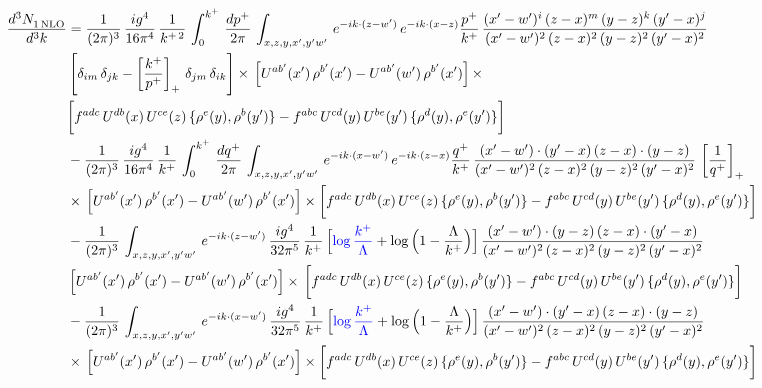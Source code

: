 \documentclass[9pt]{article}
\numberwithin{equation}{section}
\begin{document}
\begin{align}
     \frac{d^{3}N_{1\,\rm NLO}^{\rm}}{d^{3}k}  & = \frac{1}{(2\pi)^{3}}\, \frac{ig^{4}}{16\pi^{4}}\, \frac{1}{k^{+\,2}}\,\int_{0}^{k^{+}}\, \frac{dp^{+}}{2\pi}\,\int_{x,z,y,x',y'w'}\,e^{-ik\cdot (z-w^\prime)}\,e^{-ik\cdot (x-z)}\frac{p^{+}}{k^{+}}\,\frac{(x'-w')^{i}\,(z-x)^{m}\,(y-z)^{k}\,(y'-x)^{j}}{(x'-w')^{2}\,(z-x)^{2}\,(y-z)^{2}\,(y'-x)^{2}}\,\notag \\ & \left[\delta_{im}\,\delta_{jk}-\left[\frac{k^{+}}{p^{+}}\right]_{+}\, \delta_{jm}\,\delta_{ik}\right]\times\, \left[U^{ab'}(x')\,\rho^{b'}(x')-U^{ab'}(w')\,\rho^{b'}(x')\right]\times\notag \\ & \bigg[f^{adc}\,U^{db}(x)\,U^{ce}(z)\, \{\rho^{e}(y),\rho^{b}(y')\}-f^{abc}\,U^{cd}(y)\,U^{be}(y')\, \{\rho^{d}(y),\rho^{e}(y')\}\bigg]\notag \\ & -\frac{1}{(2\pi)^{3}}\, \frac{ig^{4}}{16\pi^{4}}\, \frac{1}{k^{+}}\,\int_{0}^{k^{+}}\, \frac{dq^{+}}{2\pi}\,\int_{x,z,y,x',y'w'}\,e^{-ik\cdot (x-w^\prime)}\,e^{-ik\cdot (z-x)}\frac{q^{+}}{k^{+}}\,\frac{(x'-w')\cdot (y'-x)\,(z-x)\cdot (y-z)}{(x'-w')^{2}\,(z-x)^{2}\,(y-z)^{2}\,(y'-x)^{2}}\,\left[\frac{1}{q^{+}}\right]_{+}\notag \\ & \times\, \left[U^{ab'}(x')\,\rho^{b'}(x')-U^{ab'}(w')\,\rho^{b'}(x')\right]\times \bigg[f^{adc}\,U^{db}(x)\,U^{ce}(z)\, \{\rho^{e}(y),\rho^{b}(y')\}-f^{abc}\,U^{cd}(y)\,U^{be}(y')\, \{\rho^{d}(y),\rho^{e}(y')\}\bigg]\notag \\ & -\frac{1}{(2\pi)^{3}}\, \int_{x,z,y,x',y'w'}\,e^{-ik\cdot (z-w^\prime)}\,\frac{ig^{4}}{32\pi^{5}}\, \frac{1}{k^{+}}\,\Big[{\color{blue}\log\frac{k^{+}}{\Lambda}}+\log\Big(1-\frac{\Lambda}{k^{+}}\Big)\Big]\,\frac{(x'-w')\cdot (y-z)\,(z-x)\cdot (y'-x)}{(x'-w')^{2}\,(z-x)^{2}\,(y-z)^{2}\,(y'-x)^{2}}\,\notag \\ & \left[U^{ab'}(x')\,\rho^{b'}(x')-U^{ab'}(w')\,\rho^{b'}(x')\right]\times\, \bigg[f^{adc}\,U^{db}(x)\,U^{ce}(z)\, \{\rho^{e}(y),\rho^{b}(y')\}-f^{abc}\,U^{cd}(y)\,U^{be}(y')\, \{\rho^{d}(y),\rho^{e}(y')\}\bigg]\notag \\ &  -\frac{1}{(2\pi)^{3}}\, \int_{x,z,y,x',y'w'}\,e^{-ik\cdot (x-w^\prime)}\,\frac{ig^{4}}{32\pi^{5}}\, \frac{1}{k^{+}}\,\Big[{\color{blue}\log\frac{k^{+}}{\Lambda}}+\log\Big(1-\frac{\Lambda}{k^{+}}\Big)\Big]\,\frac{(x'-w')\cdot (y'-x)\,(z-x)\cdot (y-z)}{(x'-w')^{2}\,(z-x)^{2}\,(y-z)^{2}\,(y'-x)^{2}}\notag \\ & \times\, \left[U^{ab'}(x')\,\rho^{b'}(x')-U^{ab'}(w')\,\rho^{b'}(x')\right]\times \bigg[f^{adc}\,U^{db}(x)\,U^{ce}(z)\, \{\rho^{e}(y),\rho^{b}(y')\}-f^{abc}\,U^{cd}(y)\,U^{be}(y')\, \{\rho^{d}(y),\rho^{e}(y')\}\bigg]
\end{align}
\end{document}
